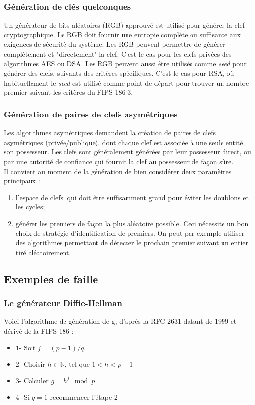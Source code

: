 \subsubsection{Génération de clés quelconques}
Un générateur de bits aléatoires (RGB) approuvé est utilisé pour générer la clef cryptographique. Le RGB doit fournir une entropie complète ou suffisante aux exigences de sécurité du système. Les RGB peuvent  permettre de générer complètement et "directement" la clef. C'est le cas pour les clefs privées des algorithmes AES ou DSA.
Les RGB peuvent aussi être utilisés comme \textit{seed} pour générer des clefs, suivants des critères spécifiques. C'est le cas pour RSA, où habituellement le \textit{seed} est utilisé comme point de départ pour trouver un nombre premier suivant les critères du FIPS 186-3.

\subsubsection{Génération de paires de clefs asymétriques}
Les algorithmes asymétriques demandent la création de paires de clefs asymétriques (privée/publique), dont chaque clef est associée à une seule entité, son possesseur. Les clefs sont généralement générées par leur possesseur direct, ou par une autorité de confiance qui fournit la clef au possesseur de façon sûre.\\
Il convient au moment de la génération de bien considérer deux paramètres principaux : 
\begin{enumerate}
\item l'espace de clefs, qui doit être suffisamment grand pour éviter les doublons et les cycles;
\item générer les premiers de façon la plus aléatoire possible. Ceci nécessite un bon choix de stratégie d'identification de premiers. On peut par exemple utiliser des algorithmes permettant de détecter le prochain premier suivant un entier tiré aléatoirement. 
\end{enumerate}

\subsection{Exemples de faille}
\subsubsection{Le générateur Diffie-Hellman}

		Voici l'algorithme de génération de g, d'après la RFC 2631 datant de 1999 et dérivé de la FIPS-186 : 
		\begin{itemize}
		\item 1- Soit $j = (p - 1)/q$.
		\item 2- Choisir $h \in \mathbb{N}$, tel que $1 < h < p - 1$
		\item 3- Calculer $g = h^j \mod p$
		\item 4- Si $g = 1$ recommencer l'étape 2\\
		\end{itemize}
	
